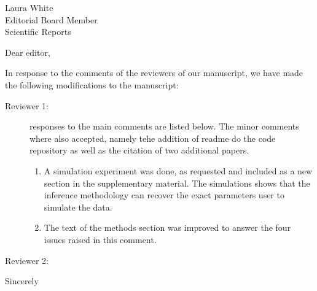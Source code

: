 \documentclass[a4paper,10pt]{letter}
\begin{document}

\begin{letter}{Laura White\\Editorial Board Member\\Scientific Reports }
\address{Escola de Matem\'atica Aplicada\\Funda\c{c}\~ao Getulio Vargas 
(FGV)\\Rio de Janeiro -- RJ\\Brazil.}

\opening{Dear editor,}

In response to the comments of the reviewers of our manuscript, we have made 
the following modifications to the manuscript:

\begin{description}
 \item[Reviewer 1:] responses to the main comments are listed below. The minor 
comments where also accepted, namely tehe addition of readme do the code 
repository as well as the citation of two  additional papers. 
 
 \begin{enumerate}
  \item A simulation experiment was done, as requested and included as a new 
section in the supplementary material. The simulations shows that the inference 
methodology can recover the exact parameters user to simulate  the data.
\item The text of the methods section was improved to answer the four issues 
raised in this comment.
 \end{enumerate}

 \item [Reviewer 2:]
\end{description}



\signature{Flávio Codeço Coelho\\Professor}

\closing{Sincerely}


\end{letter}
\end{document}
